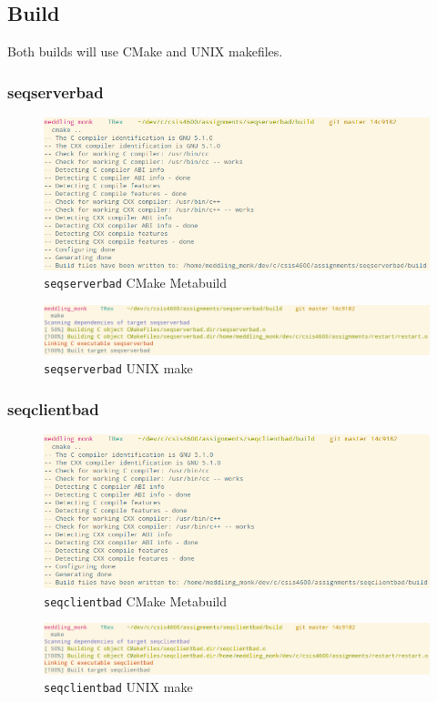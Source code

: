 \documentclass[letter,12pt,sffamily]{article}
\begin{document}
\subsection{Build}
Both builds will use CMake and UNIX makefiles.
\subsubsection{seqserverbad}
\begin{figure}[H]
	\centering
	\includegraphics[width=1\linewidth]{./images/22}
	\caption[seqserverbad_cmake_prep]{\texttt{seqserverbad} CMake Metabuild}
	\label{fig:24}
\end{figure}
\begin{figure}[H]
	\centering
	\includegraphics[width=1\linewidth]{./images/23}
	\caption[seqserverbad_make_build]{\texttt{seqserverbad} UNIX make}
	\label{fig:25}
\end{figure}
\subsubsection{seqclientbad}
\begin{figure}[H]
	\centering
	\includegraphics[width=1\linewidth]{./images/26}
	\caption[seqclientbad_cmake_prep]{\texttt{seqclientbad} CMake Metabuild}
	\label{fig:26}
\end{figure}
\begin{figure}[H]
	\centering
	\includegraphics[width=1\linewidth]{./images/27}
	\caption[seqclientbad_make_build]{\texttt{seqclientbad} UNIX make}
	\label{fig:27}
\end{figure}
\end{document}
